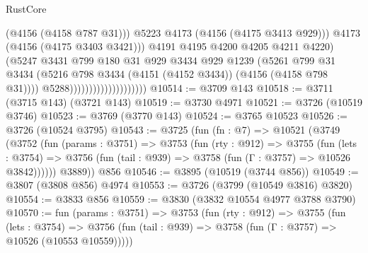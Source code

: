 \begin{lexlean}{RustCore}
\begin{coremodule}
                                                  (@4156 (@4158 @787 @31)))
                                                @5223
                                                @4173
                                                (@4156 (@4175 @3413 @929)))
                                              @4173
                                              (@4156 (@4175 @3403 @3421)))
                                            @4191
                                            @4195
                                            @4200
                                            @4205
                                            @4211
                                            @4220)
                                          (@5247
                                            @3431
                                            @799
                                            @180
                                            @31
                                            @929
                                            @3434
                                            @929
                                            @1239
                                            (@5261
                                              @799
                                              @31
                                              @3434
                                              (@5216
                                                @798
                                                @3434
                                                (@4151 (@4152 @3434))
                                                (@4156 (@4158 @798 @31))))
                                            @5288))))))))))))))))))))
@10514 := @3709 @143
@10518 := @3711 (@3715 @143) (@3721 @143)
@10519 := @3730 @4971
@10521 := @3726 (@10519 @3746)
@10523 := @3769 (@3770 @143)
@10524 := @3765 @10523
@10526 := @3726 (@10524 @3795)
@10543 := @3725
    (fun (fn : @7) =>
    @10521
      (@3749
        (@3752
          (fun (params : @3751) =>
          @3753
            (fun (rty : @912) =>
            @3755
              (fun (lets : @3754) =>
              @3756 (fun (tail : @939) => @3758 (fun (Γ : @3757) => @10526 @3842))))))
        @3889))
    @856
@10546 := @3895 (@10519 (@3744 @856))
@10549 := @3807 (@3808 @856) @4974
@10553 := @3726 (@3799 (@10549 @3816) @3820)
@10554 := @3833 @856
@10559 := @3830 (@3832 @10554 @4977 @3788 @3790)
@10570 := fun (params : @3751) =>
  @3753
    (fun (rty : @912) =>
    @3755
      (fun (lets : @3754) =>
      @3756 (fun (tail : @939) => @3758 (fun (Γ : @3757) => @10526 (@10553 @10559)))))

\end{coremodule}
\end{lexlean}
